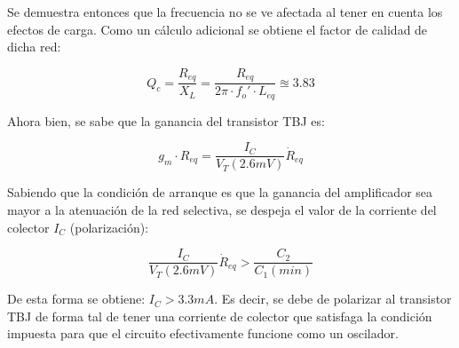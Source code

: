 Se demuestra entonces que la frecuencia no se ve afectada al tener en cuenta los efectos de carga. Como un cálculo adicional se obtiene el factor de calidad de dicha red:

\begin{equation}
\label{eq:3.6}
Q_c = \frac{R_{eq}}{X_L} = \frac{R_{eq}}{2\pi \cdot f_o' \cdot L_{eq}} \approxeq 3.83
\end{equation}

Ahora bien, se sabe que la ganancia del transistor TBJ es:

\begin{equation}
\label{eq:3.7}
g_m \cdot R_{eq} = \frac{I_C}{V_T (2.6 mV)} \dot R_{eq}
\end{equation}

Sabiendo que la condición de arranque es que la ganancia del amplificador sea mayor a la atenuación de la red selectiva, se despeja el valor de la corriente del colector $I_C$ (polarización):

\begin{equation}
\label{eq:3.8}
 \frac{I_C}{V_T (2.6 mV)} \dot R_{eq} > \frac{C_2}{C_1 (min)}
\end{equation}

De esta forma se obtiene: $I_C > 3.3 mA$. Es decir, se debe de polarizar al transistor TBJ de forma tal de tener una corriente de colector que satisfaga la condición impuesta para que el circuito efectivamente funcione como un oscilador.